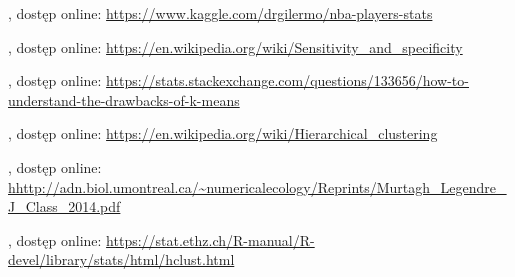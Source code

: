 \documentclass[twoside,twocolumn]{article}
\begin{document}

\begin{thebibliography}{99} %

, dostęp online:
\newblock \url{https://www.kaggle.com/drgilermo/nba-players-stats} 

, dostęp online:
\newblock \url{https://en.wikipedia.org/wiki/Sensitivity_and_specificity}

, dostęp online:
\newblock \url{https://stats.stackexchange.com/questions/133656/how-to-understand-the-drawbacks-of-k-means} 

, dostęp online:
\newblock \url{https://en.wikipedia.org/wiki/Hierarchical_clustering} 

, dostęp online:
\newblock \url{hhttp://adn.biol.umontreal.ca/~numericalecology/Reprints/Murtagh_Legendre_J_Class_2014.pdf} 

, dostęp online:
\newblock \url{https://stat.ethz.ch/R-manual/R-devel/library/stats/html/hclust.html}
\end{thebibliography}

\end{document}
